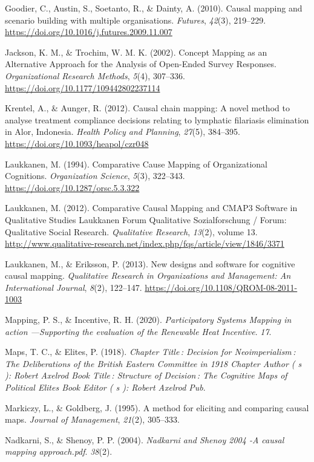 \documentclass[
]{book}
\begin{document}
Goodier, C., Austin, S., Soetanto, R., \& Dainty, A. (2010). Causal mapping and scenario building with multiple organisations. \emph{Futures}, \emph{42}(3), 219--229. \url{https://doi.org/10.1016/j.futures.2009.11.007}

Jackson, K. M., \& Trochim, W. M. K. (2002). Concept Mapping as an Alternative Approach for the Analysis of Open-Ended Survey Responses. \emph{Organizational Research Methods}, \emph{5}(4), 307--336. \url{https://doi.org/10.1177/109442802237114}

Krentel, A., \& Aunger, R. (2012). Causal chain mapping: A novel method to analyse treatment compliance decisions relating to lymphatic filariasis elimination in Alor, Indonesia. \emph{Health Policy and Planning}, \emph{27}(5), 384--395. \url{https://doi.org/10.1093/heapol/czr048}

Laukkanen, M. (1994). Comparative Cause Mapping of Organizational Cognitions. \emph{Organization Science}, \emph{5}(3), 322--343. \url{https://doi.org/10.1287/orsc.5.3.322}

Laukkanen, M. (2012). Comparative Causal Mapping and CMAP3 Software in Qualitative Studies \textbar{} Laukkanen \textbar{} Forum Qualitative Sozialforschung / Forum: Qualitative Social Research. \emph{Qualitative Research}, \emph{13}(2), volume 13. \url{http://www.qualitative-research.net/index.php/fqs/article/view/1846/3371}

Laukkanen, M., \& Eriksson, P. (2013). New designs and software for cognitive causal mapping. \emph{Qualitative Research in Organizations and Management: An International Journal}, \emph{8}(2), 122--147. \url{https://doi.org/10.1108/QROM-08-2011-1003}

Mapping, P. S., \& Incentive, R. H. (2020). \emph{Participatory Systems Mapping in action ---Supporting the evaluation of the Renewable Heat Incentive}. \emph{17}.

Maps, T. C., \& Elites, P. (1918). \emph{Chapter Title\,: Decision for Neoimperialism\,: The Deliberations of the British Eastern Committee in 1918 Chapter Author ( s ): Robert Axelrod Book Title\,: Structure of Decision\,: The Cognitive Maps of Political Elites Book Editor ( s ): Robert Axelrod Pub}.

Markiczy, L., \& Goldberg, J. (1995). A method for eliciting and comparing causal maps. \emph{Journal of Management}, \emph{21}(2), 305--333.

Nadkarni, S., \& Shenoy, P. P. (2004). \emph{Nadkarni and Shenoy 2004 -A causal mapping approach.pdf}. \emph{38}(2).
\end{document}
